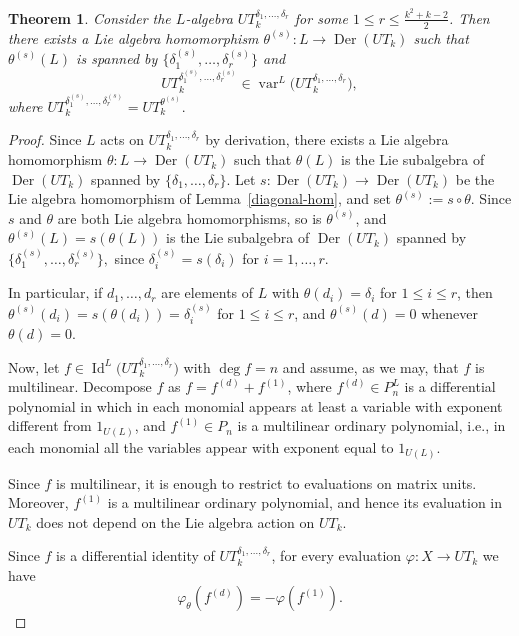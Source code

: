 \documentclass[a4paper,reqno]{amsart}
\newtheorem{theorem}{Theorem}
\theoremstyle{definition}
\numberwithin{equation}{section}
\numberwithin{theorem}{section}
\DeclareMathOperator{\I}{Id}
\DeclareMathOperator{\V}{var}
\DeclareMathOperator{\D}{Der}
\begin{document}
\begin{theorem}\label{Thm: var UT_k} 
Consider the $L$-algebra $UT_k^{\delta_1,\ldots,\delta_r}$ for some $1 \leq r \leq \frac{k^2+k-2}{2}$. Then there exists a Lie algebra homomorphism $\theta^{(s)}:L \to \D(UT_k)$ such that $\theta^{(s)}(L)$ is spanned by
$\{\delta_1^{(s)},\ldots,\delta_r^{(s)}\}$ and 
$$UT_k^{\delta_1^{(s)},\ldots,\delta_r^{(s)}} \in \V^L\big(UT_k^{\delta_1,\ldots,\delta_r}\big),$$
where $UT_k^{\delta_1^{(s)},\ldots,\delta_r^{(s)}}=UT_k^{\theta^{(s)}}.$
\end{theorem}
\begin{proof}
Since $L$ acts on $UT_k^{\delta_1, \ldots, \delta_r}$ by derivation, there exists a Lie algebra homomorphism
$\theta: L \to \D(UT_k)$
such that $\theta(L)$ is the Lie subalgebra of $\D(UT_k)$ spanned by $\{\delta_1, \ldots, \delta_r\}.$ 
Let $s : \D(UT_k) \to \D(UT_k)$ be the Lie algebra homomorphism of
Lemma~\ref{diagonal-hom}, and set $\theta^{(s)}:=s\circ \theta$. Since $s$ and $\theta$ are
both Lie algebra homomorphisms, so is $\theta^{(s)}$, and $\theta^{(s)}(L) = s(\theta(L))$ is the
Lie subalgebra of $\D(UT_k)$ spanned by  $\{\delta_1^{(s)}, \ldots, \delta_r^{(s)}\},$ since $\delta_i^{(s)}=s(\delta_i)$ for $i=1, \ldots, r.$

In particular, if $d_1, \ldots, d_r$ are
elements of $L$ with $\theta(d_i) = \delta_i$ for $1 \le i \le r$, then
$\theta^{(s)}(d_i) = s(\theta(d_i)) = \delta_i^{(s)}$ for $1 \le i \le r$, and $\theta^{(s)}(d) = 0$
whenever $\theta(d) = 0$.


    Now, let $f\in \I^L \big(UT_k^{\delta_1, \ldots, \delta_r}\big)$  with $\deg f =n$ and assume, as we may, that $f$ is multilinear. Decompose $f$ as $f=f^{(d)}+f^{(1)}$, where $f^{(d)}\in P_n^L$ is a differential polynomial in which in each monomial appears at least a variable with exponent different from $1_{U(L)}$, and $f^{(1)}\in P_n$ is a multilinear ordinary polynomial, i.e., in each monomial all the variables appear with exponent equal to $1_{U(L)}$. 

    Since $f$ is multilinear, it is enough to restrict to evaluations on matrix units.
    Moreover, $f^{(1)}$ is a multilinear ordinary polynomial, and hence its evaluation in $UT_k$ does not depend on the Lie algebra action on $UT_k$.

Since $f$ is a differential identity of $UT_k^{\delta_1, \ldots, \delta_r}$, for every evaluation $\varphi:X \longrightarrow UT_k$  we have 
 \begin{equation}\label{eq: evaluation d^d and f^1}
        \varphi_{\theta}(f^{(d)})=-\varphi(f^{(1)}).
    \end{equation}



\end{proof}
\end{document}
